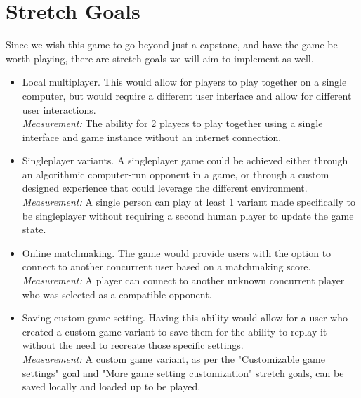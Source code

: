 \documentclass{article}
\begin{document}
\section{Stretch Goals}

Since we wish this game to go beyond just a capstone, and have the game be worth playing, there are stretch goals we will aim to implement as well.

\begin{itemize}
	\item Local multiplayer. This would allow for players to play together on a single computer, but would require a different user interface and allow for different user interactions.\\
	\textit{Measurement:} The ability for 2 players to play together using a single interface and game instance without an internet connection.
	
	\item Singleplayer variants. A singleplayer game could be achieved either through an algorithmic computer-run opponent in a game, or through a custom designed experience that could leverage the different environment.\\
	\textit{Measurement:} A single person can play at least 1 variant made specifically to be singleplayer without requiring a second human player to update the game state.
	
	\item Online matchmaking. The game would provide users with the option to connect to another concurrent user based on a matchmaking score.\\
	\textit{Measurement:} A player can connect to another unknown concurrent player who was selected as a compatible opponent.
	
	\item Saving custom game setting. Having this ability would allow for a user who created a custom game variant to save them for the ability to replay it without the need to recreate those specific settings.\\
	\textit{Measurement:} A custom game variant, as per the "Customizable game settings" goal and "More game setting customization" stretch goals, can be saved locally and loaded up to be played.
	

\end{itemize}
\end{document}
